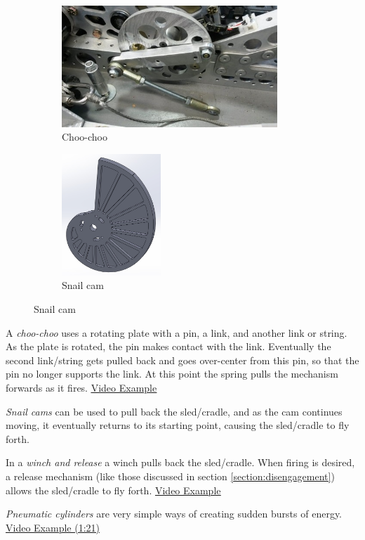 \begin{figure}[H]
\begin{subfigure}[b]{.32\linewidth}
	\includegraphics[height=1.8in]{imgs/choo_choo.jpeg}
	\caption{Choo-choo}
\end{subfigure}\begin{subfigure}[b]{.32\linewidth}
	\includegraphics[height=1.8in]{imgs/snail_cam.jpeg}
	\caption{Snail cam}
\end{subfigure}
\end{figure}

\begin{asparaenum}[a)]
\item A \textit{choo-choo} uses a rotating plate with a pin, a link, and another link or string. As the plate is rotated, the pin makes contact with the link. Eventually the second link/string gets pulled back and goes over-center from this pin, so that the pin no longer supports the link. At this point the spring pulls the mechanism forwards as it fires. \href{https://www.youtube.com/watch?v=Kh-PVMSF7VU}{\color{red}\underline{Video Example}}

\item \textit{Snail cams} can be used to pull back the sled/cradle, and as the cam continues moving, it eventually returns to its starting point, causing the sled/cradle to fly forth.

\item In a \textit{winch and release} a winch pulls back the sled/cradle. When firing is desired, a release mechanism (like those discussed in section \ref{section:disengagement}) allows the sled/cradle to fly forth. \href{https://www.youtube.com/watch?v=YFmG_b4B-BE}{\color{red}\underline{Video Example}}

\item \textit{Pneumatic cylinders} are very simple ways of creating sudden bursts of energy. \href{https://youtu.be/1QOYdA5IPJQ?t=81}{\color{red}\underline{Video Example (1:21)}}
\end{asparaenum}

